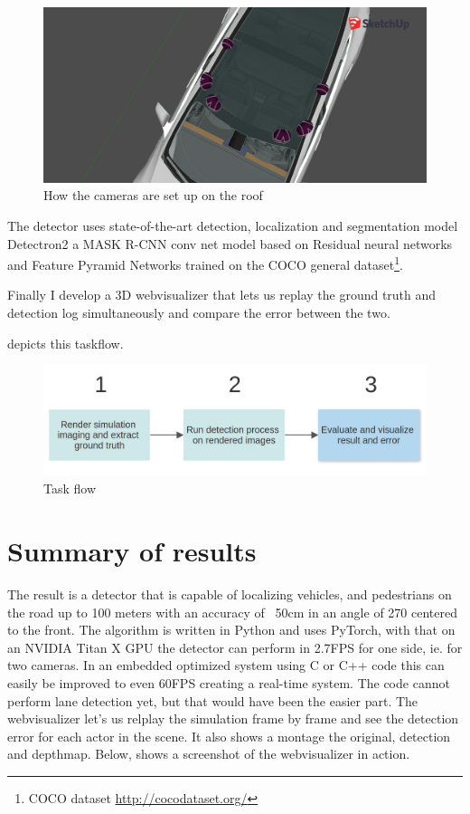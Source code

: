 \begin{figure}[!ht]
    \centering
    \includegraphics[width=150mm, keepaspectratio]{figures/3dmodel2.png}
    \caption{How the cameras are set up on the roof}
    \label{fig:3dmodel2}
\end{figure}

The detector uses state-of-the-art detection, localization and segmentation model
Detectron2 \cite{wu2019detectron2} a MASK R-CNN conv net model based on Residual
neural networks and Feature Pyramid Networks trained on the COCO general
dataset\footnote{COCO dataset \url{http://cocodataset.org/}}.

Finally I develop a 3D webvisualizer that lets us replay the ground truth and
detection log simultaneously and compare the error between the two.

 depicts this taskflow.

\begin{figure}[!ht]
    \centering
    \includegraphics[width=150mm, keepaspectratio]{figures/flowchart.png}
    \caption{Task flow}
    \label{fig:flow}
\end{figure}

\section{Summary of results}

The result is a detector that is capable of localizing vehicles, and pedestrians
on the road up to 100 meters with an accuracy of ~50cm in an angle of 270\degree
centered to the front. The algorithm is written in Python and uses PyTorch, with that on
an NVIDIA Titan X GPU the detector can perform in 2.7FPS for one side, ie. for
two cameras. In an embedded optimized system using C or C++ code this can easily
be improved to even 60FPS creating a real-time system. The code cannot perform
lane detection yet, but that would have been the easier part. The webvisualizer
let's us relplay the simulation frame by frame and see the detection error for
each actor in the scene. It also shows a montage the original, detection and
depthmap. Below,  shows a screenshot of the webvisualizer
in action.

